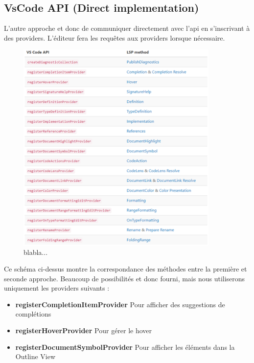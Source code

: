 \documentclass[
    iict, %
    il, %
]{heig-tb}
\begin{document}
\subsection{VsCode API (Direct implementation)}
L'autre approche et donc de communiquer directement avec l'api en s'inscrivant à des providers.
L'éditeur fera les requêtes aux providers lorsque nécessaire.

\begin{figure}[!ht]
    \begin{center}
        \includegraphics[width=10cm]{assets/figures/api-vscode.png}
    \end{center}
    \caption[API]{\label{test} blabla...}
\end{figure}

Ce schéma ci-dessus montre la correspondance des méthodes entre la première et seconde approche.
Beaucoup de possibilités et donc fourni, mais nous utiliserons uniquement les providers suivants :

\begin{itemize}
    \item \textbf{registerCompletionItemProvider}
          \subitem Pour afficher des suggestions de complétions
    \item \textbf{registerHoverProvider}
          \subitem Pour gérer le hover
    \item \textbf{registerDocumentSymbolProvider}
          \subitem Pour afficher les éléments dans la Outline View
\end{itemize}
\end{document}
